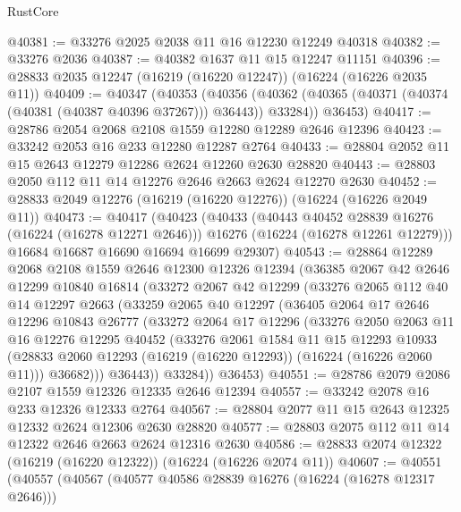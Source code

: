 \begin{lexlean}{RustCore}
\begin{coremodule}
@40381 := @33276 @2025 @2038 @11 @16 @12230 @12249 @40318
@40382 := @33276 @2036
@40387 := @40382 @1637 @11 @15 @12247 @11151
@40396 := @28833 @2035 @12247 (@16219 (@16220 @12247)) (@16224 (@16226 @2035 @11))
@40409 := @40347
    (@40353
      (@40356 (@40362 (@40365 (@40371 (@40374 (@40381 (@40387 @40396 @37267))) @36443)) @33284))
      @36453)
@40417 := @28786 @2054 @2068 @2108 @1559 @12280 @12289 @2646 @12396
@40423 := @33242 @2053 @16 @233 @12280 @12287 @2764
@40433 := @28804 @2052 @11 @15 @2643 @12279 @12286 @2624 @12260 @2630 @28820
@40443 := @28803 @2050 @112 @11 @14 @12276 @2646 @2663 @2624 @12270 @2630
@40452 := @28833 @2049 @12276 (@16219 (@16220 @12276)) (@16224 (@16226 @2049 @11))
@40473 := @40417
    (@40423
      (@40433
        (@40443 @40452 @28839 @16276 (@16224 (@16278 @12271 @2646)))
        @16276
        (@16224 (@16278 @12261 @12279)))
      @16684
      @16687
      @16690
      @16694
      @16699
      @29307)
@40543 := @28864
    @12289
    @2068
    @2108
    @1559
    @2646
    @12300
    @12326
    @12394
    (@36385
      @2067
      @42
      @2646
      @12299
      @10840
      @16814
      (@33272
        @2067
        @42
        @12299
        (@33276
          @2065
          @112
          @40
          @14
          @12297
          @2663
          (@33259
            @2065
            @40
            @12297
            (@36405
              @2064
              @17
              @2646
              @12296
              @10843
              @26777
              (@33272
                @2064
                @17
                @12296
                (@33276
                  @2050
                  @2063
                  @11
                  @16
                  @12276
                  @12295
                  @40452
                  (@33276
                    @2061
                    @1584
                    @11
                    @15
                    @12293
                    @10933
                    (@28833 @2060 @12293 (@16219 (@16220 @12293)) (@16224 (@16226 @2060 @11)))
                    @36682)))
              @36443))
          @33284))
      @36453)
@40551 := @28786 @2079 @2086 @2107 @1559 @12326 @12335 @2646 @12394
@40557 := @33242 @2078 @16 @233 @12326 @12333 @2764
@40567 := @28804 @2077 @11 @15 @2643 @12325 @12332 @2624 @12306 @2630 @28820
@40577 := @28803 @2075 @112 @11 @14 @12322 @2646 @2663 @2624 @12316 @2630
@40586 := @28833 @2074 @12322 (@16219 (@16220 @12322)) (@16224 (@16226 @2074 @11))
@40607 := @40551
    (@40557
      (@40567
        (@40577 @40586 @28839 @16276 (@16224 (@16278 @12317 @2646)))

\end{coremodule}
\end{lexlean}
